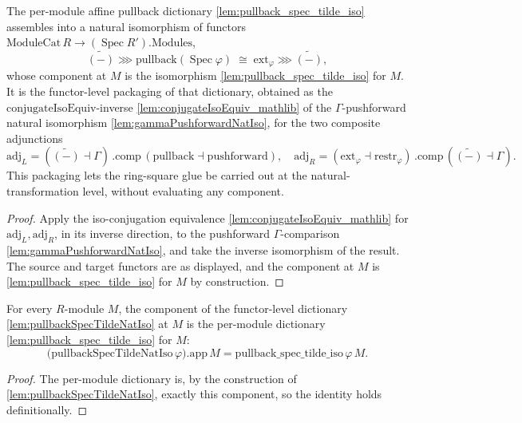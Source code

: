 \begin{lemma}


  \label{lem:pullbackSpecTildeNatIso}
  The per-module affine pullback dictionary \cref{lem:pullback_spec_tilde_iso} assembles into a
  natural isomorphism of functors
  \(\mathrm{ModuleCat}\,R \to (\operatorname{Spec} R').\mathrm{Modules}\),
  \[
    \widetilde{(-)} \ggg \mathrm{pullback}(\operatorname{Spec}\varphi)
      \;\cong\;
    \mathrm{ext}_\varphi \ggg \widetilde{(-)},
  \]
  whose component at \(M\) is the isomorphism \cref{lem:pullback_spec_tilde_iso} for \(M\). It is the
  functor-level packaging of that dictionary, obtained as the
  \(\mathrm{conjugateIsoEquiv}\)-inverse \cref{lem:conjugateIsoEquiv_mathlib} of the
  \(\Gamma\)-pushforward natural isomorphism \cref{lem:gammaPushforwardNatIso}, for the two composite
  adjunctions
  \[
    \mathrm{adj}_L = (\widetilde{(-)}\dashv\Gamma)\,.\mathrm{comp}\,
      (\mathrm{pullback}\dashv\mathrm{pushforward}),
    \quad
    \mathrm{adj}_R = (\mathrm{ext}_\varphi\dashv\mathrm{restr}_\varphi)\,.\mathrm{comp}\,
      (\widetilde{(-)}\dashv\Gamma).
  \]
  This packaging lets the ring-square glue be carried out at the natural-transformation level, without
  evaluating any component.
  \begin{proof}
    Apply the iso-conjugation equivalence \cref{lem:conjugateIsoEquiv_mathlib} for
    \(\mathrm{adj}_L,\mathrm{adj}_R\), in its inverse direction, to the pushforward
    \(\Gamma\)-comparison \cref{lem:gammaPushforwardNatIso}, and take the inverse isomorphism of the
    result. The source and target functors are as displayed, and the component at \(M\) is
    \cref{lem:pullback_spec_tilde_iso} for \(M\) by construction.
  \end{proof}
\end{lemma}

\begin{lemma}


  \label{lem:pullbackSpecTildeNatIso_app}
  For every \(R\)-module \(M\), the component of the functor-level dictionary
  \cref{lem:pullbackSpecTildeNatIso} at \(M\) is the per-module dictionary
  \cref{lem:pullback_spec_tilde_iso} for \(M\):
  \[
    \bigl(\mathrm{pullbackSpecTildeNatIso}\,\varphi\bigr).\mathrm{app}\,M
      = \mathrm{pullback\_spec\_tilde\_iso}\,\varphi\,M .
  \]
  \begin{proof}
    The per-module dictionary is, by the construction of \cref{lem:pullbackSpecTildeNatIso}, exactly
    this component, so the identity holds definitionally.
  \end{proof}
\end{lemma}

